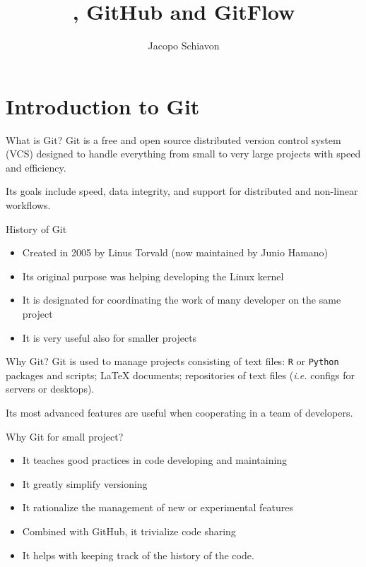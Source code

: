 \documentclass{beamer}
\title{\git, GitHub and GitFlow}
\author{Jacopo Schiavon}
\institute[Dep. Statistical Sciences --- UNIPD]{Department of Statistical Sciences\\ University of Padova}
\newcommand{\git}{Git{}}
\newcommand{\cd}[1]{\texttt{#1}}
\begin{document}
\begin{frame}[plain]
    \maketitle
\end{frame}

\begin{frame}{}
\tableofcontents
\end{frame}

\section{Introduction to \git}
\begin{frame}{What is \git?}
    \alert{\git} is a \alert{free} and \alert{open source} distributed \alert{version control system} (VCS) designed to handle everything from small to very large projects with speed and efficiency. 
    
    Its goals include \alert{speed}, \alert{data integrity}, and support for \alert{distributed} and \alert{non-linear} workflows.
    
    \begin{block}{History of \git}
        \begin{itemize}
            \item Created in 2005 by Linus Torvald (now maintained by Junio Hamano)
            \item Its original purpose was helping developing the Linux kernel
            \item It is designated for coordinating the work of many developer on the same project
            \item It is very useful also for smaller projects
        \end{itemize}
    \end{block}
\end{frame}

\begin{frame}{Why \git?}
    \git{} is used to manage projects consisting of \alert{text files}: \cd{R} or \cd{Python} packages and scripts; \LaTeX{} documents; repositories of text files (\textit{i.e.} configs for servers or desktops).
    
    Its most advanced features are useful when cooperating in a team of developers.
    \begin{block}{Why \git{} for small project?}
        \begin{itemize}
            \item It teaches \alert{good practices} in code developing and maintaining
            \item It greatly simplify \alert{versioning} 
            \item It rationalize the management of new or experimental features
            \item Combined with GitHub, it trivialize \alert{code sharing}
            \item It helps with keeping track of the \alert{history of the code}.
        \end{itemize}
    \end{block}
\end{frame}
\end{document}
